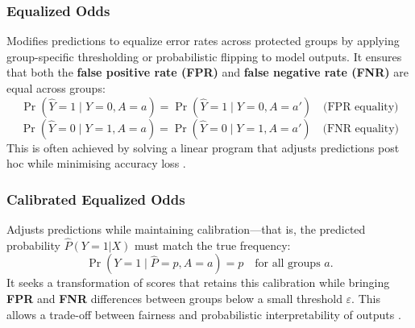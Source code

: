 \documentclass[12pt,a4paper,openright,twoside]{book}
\begin{document}
\subsubsection{Equalized Odds} Modifies predictions to equalize error rates across protected groups by applying group-specific thresholding or probabilistic flipping to model outputs. It ensures that both the \textbf{false positive rate (FPR)} and \textbf{false negative rate (FNR)} are equal across groups:
\begin{equation}
    \Pr(\hat{Y} = 1 \mid Y = 0, A = a) = \Pr(\hat{Y} = 1 \mid Y = 0, A = a') \quad\text{(FPR equality)}
\end{equation}
\begin{equation}
    \Pr(\hat{Y} = 0 \mid Y = 1, A = a) = \Pr(\hat{Y} = 0 \mid Y = 1, A = a') \quad\text{(FNR equality)}
\end{equation}
This is often achieved by solving a linear program that adjusts predictions post hoc while minimising accuracy loss \cite{hardt2016equalityopportunitysupervisedlearning}.

\subsubsection{Calibrated Equalized Odds} Adjusts predictions while maintaining calibration—that is, the predicted probability \begin{math}\hat{P}(Y=1|X)\end{math} must match the true frequency:
\begin{equation}
        \Pr(Y = 1 \mid \hat{P} = p, A = a) = p \quad\text{for all groups } a.
\end{equation}
It seeks a transformation of scores that retains this calibration while bringing \textbf{FPR} and \textbf{FNR} differences between groups below a small threshold \begin{math}\varepsilon\end{math}. This allows a trade-off between fairness and probabilistic interpretability of outputs \cite{NIPS2017_b8b9c74a}.
\end{document}

